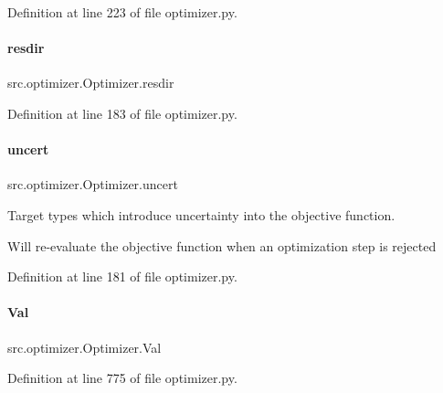 Definition at line 223 of file optimizer.\+py.

\mbox{\label{classsrc_1_1optimizer_1_1Optimizer_adbf584d06545ac2417ea8d161ec33b88}} 
\paragraph{\texorpdfstring{resdir}{resdir}}
{\footnotesize\ttfamily src.\+optimizer.\+Optimizer.\+resdir}



Definition at line 183 of file optimizer.\+py.

\mbox{\label{classsrc_1_1optimizer_1_1Optimizer_aa75c8d8660bf183bd4177227a9d4e698}} 
\paragraph{\texorpdfstring{uncert}{uncert}}
{\footnotesize\ttfamily src.\+optimizer.\+Optimizer.\+uncert}



Target types which introduce uncertainty into the objective function. 

Will re-\/evaluate the objective function when an optimization step is rejected 

Definition at line 181 of file optimizer.\+py.

\mbox{\label{classsrc_1_1optimizer_1_1Optimizer_af55d853379aa9f712413c0b65db94b30}} 
\paragraph{\texorpdfstring{Val}{Val}}
{\footnotesize\ttfamily src.\+optimizer.\+Optimizer.\+Val}



Definition at line 775 of file optimizer.\+py.

